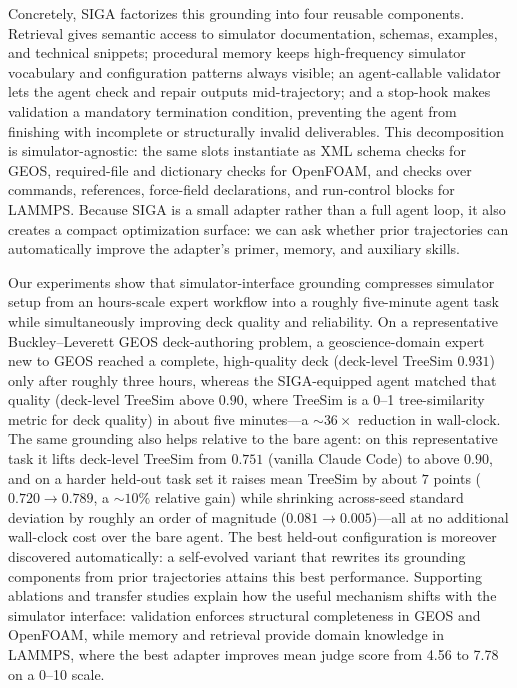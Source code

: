 \documentclass{article}
\begin{document}
Concretely, SIGA factorizes this grounding into four reusable components. Retrieval gives semantic access to simulator documentation, schemas, examples, and technical snippets; procedural memory keeps high-frequency simulator vocabulary and configuration patterns always visible; an agent-callable validator lets the agent check and repair outputs mid-trajectory; and a stop-hook makes validation a mandatory termination condition, preventing the agent from finishing with incomplete or structurally invalid deliverables. This decomposition is simulator-agnostic: the same slots instantiate as XML schema checks for GEOS, required-file and dictionary checks for OpenFOAM, and checks over commands, references, force-field declarations, and run-control blocks for LAMMPS. Because SIGA is a small adapter rather than a full agent loop, it also creates a compact optimization surface: we can ask whether prior trajectories can automatically improve the adapter’s primer, memory, and auxiliary skills.

Our experiments show that simulator-interface grounding compresses simulator setup from an hours-scale expert workflow into a roughly five-minute agent task while simultaneously improving deck quality and reliability. On a representative Buckley–Leverett GEOS deck-authoring problem, a geoscience-domain expert new to GEOS reached a complete, high-quality deck (deck-level TreeSim $0.931$) only after roughly three hours, whereas the SIGA-equipped agent matched that quality (deck-level TreeSim above $0.90$, where TreeSim is a 0–1 tree-similarity metric for deck quality) in about five minutes---a ${\sim}36\times$ reduction in wall-clock. The same grounding also helps relative to the bare agent: on this representative task it lifts deck-level TreeSim from $0.751$ (vanilla Claude Code) to above $0.90$, and on a harder held-out task set it raises mean TreeSim by about $7$ points ($0.720 \to 0.789$, a ${\sim}10\%$ relative gain) while shrinking across-seed standard deviation by roughly an order of magnitude ($0.081 \to 0.005$)---all at no additional wall-clock cost over the bare agent. The best held-out configuration is moreover discovered automatically: a self-evolved variant that rewrites its grounding components from prior trajectories attains this best performance. Supporting ablations and transfer studies explain how the useful mechanism shifts with the simulator interface: validation enforces structural completeness in GEOS and OpenFOAM, while memory and retrieval provide domain knowledge in LAMMPS, where the best adapter improves mean judge score from 4.56 to 7.78 on a 0–10 scale.
\end{document}
